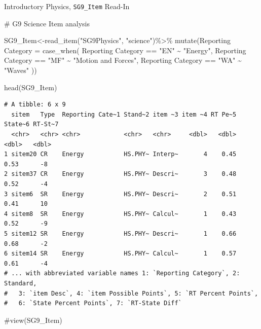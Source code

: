\documentclass[
  letterpaper,
  DIV=11,
  numbers=noendperiod]{scrartcl}
\newenvironment{Shaded}{\begin{snugshade}}{\end{snugshade}}
\newcommand{\AttributeTok}[1]{\textcolor[rgb]{0.40,0.45,0.13}{#1}}
\newcommand{\CommentTok}[1]{\textcolor[rgb]{0.37,0.37,0.37}{#1}}
\newcommand{\FunctionTok}[1]{\textcolor[rgb]{0.28,0.35,0.67}{#1}}
\newcommand{\NormalTok}[1]{\textcolor[rgb]{0.00,0.23,0.31}{#1}}
\newcommand{\OtherTok}[1]{\textcolor[rgb]{0.00,0.23,0.31}{#1}}
\newcommand{\SpecialCharTok}[1]{\textcolor[rgb]{0.37,0.37,0.37}{#1}}
\newcommand{\StringTok}[1]{\textcolor[rgb]{0.13,0.47,0.30}{#1}}
\begin{document}
Introductory Physics, \texttt{SG9\_Item} Read-In

\begin{Shaded}
\begin{Highlighting}[]
\CommentTok{\# G9 Science Item analysis}


\NormalTok{SG9\_Item}\OtherTok{\textless{}{-}}\FunctionTok{read\_item}\NormalTok{(}\StringTok{"SG9Physics"}\NormalTok{, }\StringTok{"science"}\NormalTok{)}\SpecialCharTok{\%\textgreater{}\%}
  \FunctionTok{mutate}\NormalTok{(}\StringTok{\textasciigrave{}}\AttributeTok{Reporting Category}\StringTok{\textasciigrave{}} \OtherTok{=} \FunctionTok{case\_when}\NormalTok{(}
    \StringTok{\textasciigrave{}}\AttributeTok{Reporting Category}\StringTok{\textasciigrave{}} \SpecialCharTok{==} \StringTok{"EN"} \SpecialCharTok{\textasciitilde{}} \StringTok{"Energy"}\NormalTok{,}
    \StringTok{\textasciigrave{}}\AttributeTok{Reporting Category}\StringTok{\textasciigrave{}} \SpecialCharTok{==} \StringTok{"MF"} \SpecialCharTok{\textasciitilde{}} \StringTok{"Motion and Forces"}\NormalTok{,}
    \StringTok{\textasciigrave{}}\AttributeTok{Reporting Category}\StringTok{\textasciigrave{}} \SpecialCharTok{==} \StringTok{"WA"} \SpecialCharTok{\textasciitilde{}} \StringTok{"Waves"}
\NormalTok{    ))}
                   
\FunctionTok{head}\NormalTok{(SG9\_Item)}
\end{Highlighting}
\end{Shaded}

\begin{verbatim}
# A tibble: 6 x 9
  sitem   Type  Reporting Cate~1 Stand~2 item ~3 item ~4 RT Pe~5 State~6 RT-St~7
  <chr>   <chr> <chr>            <chr>   <chr>     <dbl>   <dbl>   <dbl>   <dbl>
1 sitem20 CR    Energy           HS.PHY~ Interp~       4    0.45    0.53      -8
2 sitem37 CR    Energy           HS.PHY~ Descri~       3    0.48    0.52      -4
3 sitem6  SR    Energy           HS.PHY~ Descri~       2    0.51    0.41      10
4 sitem8  SR    Energy           HS.PHY~ Calcul~       1    0.43    0.52      -9
5 sitem12 SR    Energy           HS.PHY~ Descri~       1    0.66    0.68      -2
6 sitem14 SR    Energy           HS.PHY~ Calcul~       1    0.57    0.61      -4
# ... with abbreviated variable names 1: `Reporting Category`, 2: Standard,
#   3: `item Desc`, 4: `item Possible Points`, 5: `RT Percent Points`,
#   6: `State Percent Points`, 7: `RT-State Diff`
\end{verbatim}

\begin{Shaded}
\begin{Highlighting}[]
\CommentTok{\#view(SG9\_Item)}
\end{Highlighting}
\end{Shaded}
\end{document}
